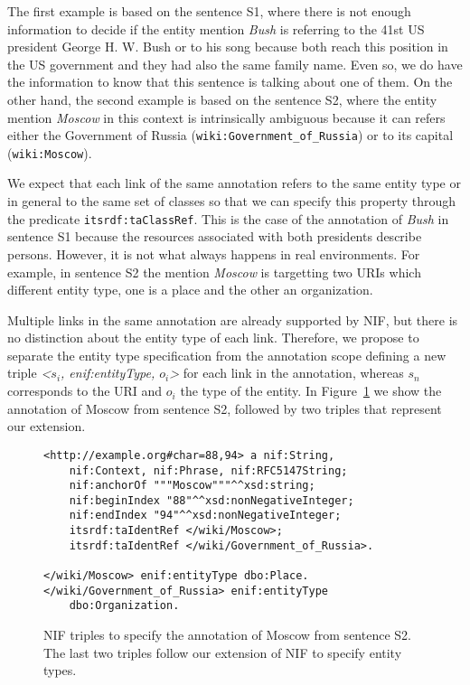 \documentclass[sigconf]{acmart}
\begin{document}
The first example is based on the sentence S1, where there is not enough information to decide if the entity mention \textit{Bush} is referring to the 41st US president George H. W. Bush or to his song because both reach this position in the US government and they had also the same family name. Even so, we do have the information to know that this sentence is talking about one of them. On the other hand, the second example is based on the sentence S2, where the entity mention \textit{Moscow} in this context is intrinsically ambiguous because it can refers either the Government of Russia (\texttt{wiki:Government\_of\_Russia}) or to its capital (\texttt{wiki:Moscow}). 


We expect that each link of the same annotation refers to the same entity type or in general to the same set of classes so that we can specify this property through the predicate \texttt{itsrdf:taClassRef}. This is the case of the annotation of \textit{Bush} in sentence S1 because the resources associated with both presidents describe persons. However, it is not what always happens in real environments. For example, in sentence S2 the mention \textit{Moscow} is targetting two URIs which different entity type, one is a place and the other an organization.

Multiple links in the same annotation are already supported by NIF, but there is no distinction about the entity type of each link. Therefore, we propose to separate the entity type specification from the annotation scope defining a new triple \textit{<$s_i$, enif:entityType, $o_i$>} for each link in the annotation, whereas $s_n$ corresponds to the URI and $o_i$ the type of the entity. In Figure~\ref{fig:nif} we show the annotation of Moscow from sentence S2, followed by two triples that represent our extension. 

\begin{figure}
\caption{NIF triples to specify the annotation of Moscow from sentence S2. The last two triples follow our extension of NIF to specify entity types.}
\label{fig:nif}
\begin{Verbatim}[frame=single]
<http://example.org#char=88,94> a nif:String, 
    nif:Context, nif:Phrase, nif:RFC5147String;
    nif:anchorOf """Moscow"""^^xsd:string;
    nif:beginIndex "88"^^xsd:nonNegativeInteger;
    nif:endIndex "94"^^xsd:nonNegativeInteger;
    itsrdf:taIdentRef </wiki/Moscow>;
    itsrdf:taIdentRef </wiki/Government_of_Russia>.  
    
</wiki/Moscow> enif:entityType dbo:Place.
</wiki/Government_of_Russia> enif:entityType 
    dbo:Organization.
\end{Verbatim}
\end{figure}
\end{document}
